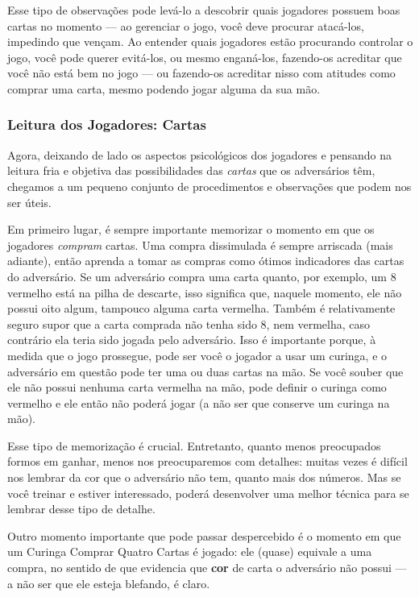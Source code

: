 Esse tipo de observações pode levá-lo a descobrir quais jogadores possuem boas cartas no momento --- ao gerenciar o jogo, você deve procurar atacá-los, impedindo que vençam. Ao entender quais jogadores estão procurando controlar o jogo, você pode querer evitá-los, ou mesmo enganá-los, fazendo-os acreditar que você não está bem no jogo --- ou fazendo-os acreditar nisso com atitudes como comprar uma carta, mesmo podendo jogar alguma da sua mão.

\subsubsection{Leitura dos Jogadores: Cartas}

\label{leituradosjogadorescartas}

Agora, deixando de lado os aspectos psicológicos dos jogadores e pensando na leitura fria e objetiva das possibilidades das \textit{cartas} que os adversários têm, chegamos a um pequeno conjunto de procedimentos e observações que podem nos ser úteis.

Em primeiro lugar, é sempre importante memorizar o momento em que os jogadores \textit{compram} cartas. Uma compra dissimulada é sempre arriscada (mais adiante), então aprenda a tomar as compras como ótimos indicadores das cartas do adversário. Se um adversário compra uma carta quanto, por exemplo, um 8 vermelho está na pilha de descarte, isso significa que, naquele momento, ele não possui oito algum, tampouco alguma carta vermelha. Também é relativamente seguro supor que a carta comprada não tenha sido 8, nem vermelha, caso contrário ela teria sido jogada pelo adversário. Isso é importante porque, à medida que o jogo prossegue, pode ser você o jogador a usar um curinga, e o adversário em questão pode ter uma ou duas cartas na mão. Se você souber que ele não possui nenhuma carta vermelha na mão, pode definir o curinga como vermelho e ele então não poderá jogar (a não ser que conserve um curinga na mão).

Esse tipo de memorização é crucial. Entretanto, quanto menos preocupados formos em ganhar, menos nos preocuparemos com detalhes: muitas vezes é difícil nos lembrar da cor que o adversário não tem, quanto mais dos números. Mas se você treinar e estiver interessado, poderá desenvolver uma melhor técnica para se lembrar desse tipo de detalhe.

Outro momento importante que pode passar despercebido é o momento em que um Curinga Comprar Quatro Cartas é jogado: ele (quase) equivale a uma compra, no sentido de que evidencia que \textbf{cor} de carta o adversário não possui --- a não ser que ele esteja blefando, é claro.

